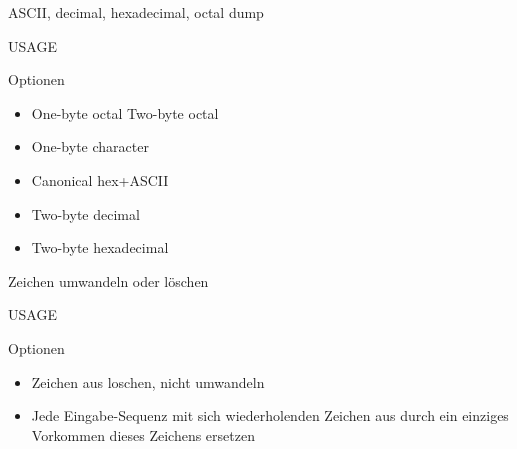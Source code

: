 \documentclass[aspectratio=43]{beamer}
\begin{document}
\begin{frame} 
	\begin{block}{} 
        		ASCII, decimal, hexadecimal, octal dump
	\end{block}
	\begin{block}{USAGE} 
        		\\
        		\hspace{1.4cm}
	
	\end{block}

	\begin{exampleblock}{Optionen} 
	\begin{itemize}
	\item {} One-byte octal  Two-byte octal 
	\item {} One-byte character 
	\item {} Canonical hex+ASCII  
	\item {} Two-byte decimal 
	\item {} Two-byte hexadecimal 
	\end{itemize}
	
	\end{exampleblock}



\end{frame}

\begin{frame} 
	\begin{block}{} 
        Zeichen umwandeln oder löschen
	\end{block}
	\begin{block}{USAGE} 
	\end{block}
	\begin{exampleblock}{Optionen} 
	\begin{itemize}
	\item {} \newline Zeichen aus  loschen, nicht umwandeln
	\item {} \newline Jede Eingabe-Sequenz mit sich wiederholenden Zeichen aus  
              durch ein einziges Vorkommen dieses Zeichens ersetzen
	\end{itemize}
	
	\end{exampleblock}
\end{frame}
\end{document}
